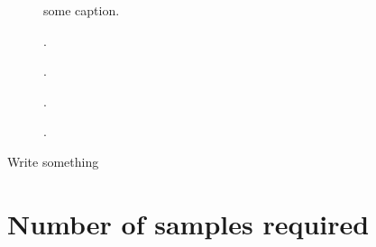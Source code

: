 \documentclass{report}
\begin{document}
\begin{figure}[!t]
    \centering
    
    \caption{some caption.}
\end{figure}

\begin{figure}[!t]
    \centering
    
    \caption{.}
\end{figure}

\begin{figure}[!t]
    \centering
    
    \caption{.}
\end{figure}

\begin{figure}[!t]
    \centering
    
    \caption{.}
\end{figure}

\begin{figure}[!t]
    \centering
    
    \caption{.}
\end{figure}

Write something

\section*{Number of samples required}

\printbibliography
\end{document}
